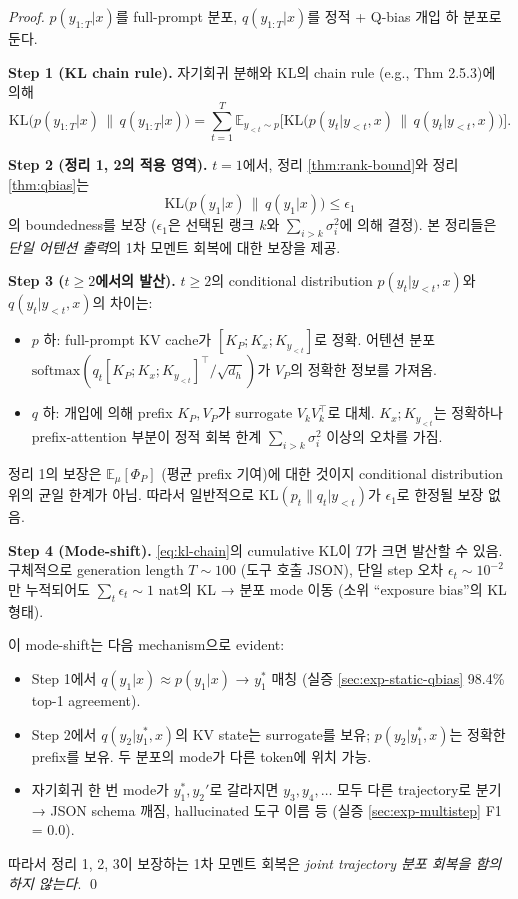 \documentclass[11pt]{article}
\theoremstyle{definition}
\newcommand{\E}{\mathbb{E}}
\newcommand{\Phip}{\Phi_P}
\newcommand{\dh}{d_h}
\newcommand{\softmax}{\mathrm{softmax}}
\begin{document}
\begin{proof}
$p(y_{1:T}|x)$를 full-prompt 분포, $q(y_{1:T}|x)$를 정적 + Q-bias 개입 하 분포로 둔다.

\textbf{Step 1 (KL chain rule).}
자기회귀 분해와 KL의 chain rule (e.g., \citet{cover2006elements} Thm 2.5.3)에 의해
\begin{equation}
\mathrm{KL}\bigl(p(y_{1:T}|x) \,\|\, q(y_{1:T}|x)\bigr) = \sum_{t=1}^T \E_{y_{<t}\sim p}\bigl[\mathrm{KL}\bigl(p(y_t | y_{<t}, x) \,\|\, q(y_t | y_{<t}, x)\bigr)\bigr].
\label{eq:kl-chain}
\end{equation}

\textbf{Step 2 (정리 1, 2의 적용 영역).}
$t = 1$에서, 정리 \ref{thm:rank-bound}와 정리 \ref{thm:qbias}는
\begin{equation}
\mathrm{KL}\bigl(p(y_1|x) \,\|\, q(y_1|x)\bigr) \le \epsilon_1
\end{equation}
의 boundedness를 보장 ($\epsilon_1$은 선택된 랭크 $k$와 $\sum_{i>k}\sigma_i^2$에 의해 결정). 본 정리들은 \emph{단일 어텐션 출력}의 1차 모멘트 회복에 대한 보장을 제공.

\textbf{Step 3 ($t \ge 2$에서의 발산).}
$t \ge 2$의 conditional distribution $p(y_t | y_{<t}, x)$와 $q(y_t | y_{<t}, x)$의 차이는:
\begin{itemize}[leftmargin=*]
\item $p$ 하: full-prompt KV cache가 $[K_P; K_x; K_{y_{<t}}]$로 정확. 어텐션 분포 $\softmax(q_t [K_P; K_x; K_{y_{<t}}]^\top / \sqrt{\dh})$가 $V_P$의 정확한 정보를 가져옴.
\item $q$ 하: 개입에 의해 prefix $K_P, V_P$가 surrogate $V_k V_k^\top$로 대체. $K_x; K_{y_{<t}}$는 정확하나 prefix-attention 부분이 정적 회복 한계 $\sum_{i>k}\sigma_i^2$ 이상의 오차를 가짐.
\end{itemize}
정리 1의 보장은 $\E_\mu[\Phip]$ (평균 prefix 기여)에 대한 것이지 conditional distribution 위의 균일 한계가 아님. 따라서 일반적으로 $\mathrm{KL}(p_t \| q_t | y_{<t})$가 $\epsilon_1$로 한정될 보장 없음.

\textbf{Step 4 (Mode-shift).}
\eqref{eq:kl-chain}의 cumulative KL이 $T$가 크면 발산할 수 있음. 구체적으로 generation length $T \sim 100$ (도구 호출 JSON), 단일 step 오차 $\epsilon_t \sim 10^{-2}$만 누적되어도 $\sum_t \epsilon_t \sim 1$ nat의 KL → 분포 mode 이동 (소위 ``exposure bias''의 KL 형태).

이 mode-shift는 다음 mechanism으로 evident:
\begin{itemize}[leftmargin=*]
\item Step 1에서 $q(y_1|x) \approx p(y_1|x)$ → $y_1^*$ 매칭 (실증 \cref{sec:exp-static-qbias} 98.4\% top-1 agreement).
\item Step 2에서 $q(y_2 | y_1^*, x)$의 KV state는 surrogate를 보유; $p(y_2 | y_1^*, x)$는 정확한 prefix를 보유. 두 분포의 mode가 다른 token에 위치 가능.
\item 자기회귀 한 번 mode가 $y_1^*, y_2'$로 갈라지면 $y_3, y_4, \dots$ 모두 다른 trajectory로 분기 → JSON schema 깨짐, hallucinated 도구 이름 등 (실증 \cref{sec:exp-multistep} F1 = 0.0).
\end{itemize}

따라서 정리 1, 2, 3이 보장하는 1차 모멘트 회복은 \emph{joint trajectory 분포 회복을 함의하지 않는다}. \qed
\end{proof}
\end{document}
